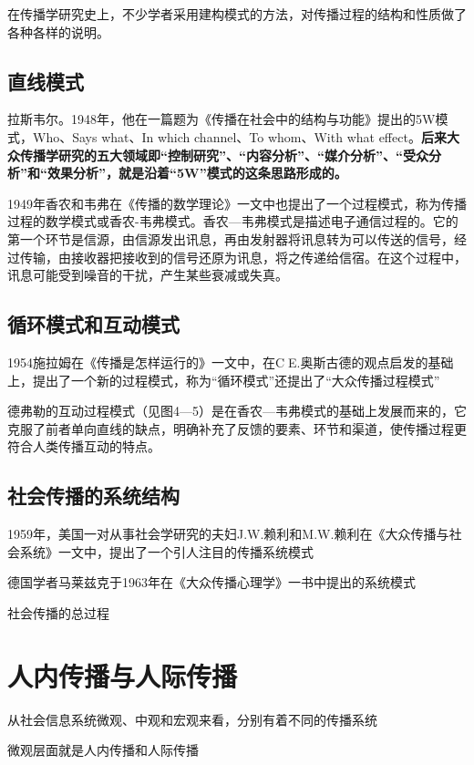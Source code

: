 \documentclass[UTF8,12pt]{ctexart}
\numberwithin{equation}{section} %
\numberwithin{figure}{section}
\numberwithin{table}{section}
\begin{document}
	在传播学研究史上，不少学者采用建构模式的方法，对传播过程的结构和性质做了各种各样的说明。
	
	\subsection{直线模式}
		
	拉斯韦尔。1948年，他在一篇题为《传播在社会中的结构与功能》提出的5W模式，Who、Says what、In which channel、To whom、With what effect。\textbf{后来大众传播学研究的五大领域即“控制研究”、“内容分析”、“媒介分析”、“受众分析”和“效果分析”，就是沿着“5W”模式的这条思路形成的。}
	
	1949年香农和韦弗在《传播的数学理论》一文中也提出了一个过程模式，称为传播过程的数学模式或香农-韦弗模式。香农—韦弗模式是描述电子通信过程的。它的第一个环节是信源，由信源发出讯息，再由发射器将讯息转为可以传送的信号，经过传输，由接收器把接收到的信号还原为讯息，将之传递给信宿。在这个过程中，讯息可能受到噪音的干扰，产生某些衰减或失真。
	
	\subsection{循环模式和互动模式}
	
	1954施拉姆在《传播是怎样运行的》一文中，在CE.奥斯古德的观点启发的基础上，提出了一个新的过程模式，称为“循环模式”还提出了“大众传播过程模式”
	
	德弗勒的互动过程模式（见图4—5）是在香农—韦弗模式的基础上发展而来的，它克服了前者单向直线的缺点，明确补充了反馈的要素、环节和渠道，使传播过程更符合人类传播互动的特点。
	
	
	\subsection{社会传播的系统结构}
	
	1959年，美国一对从事社会学研究的夫妇J.W.赖利和M.W.赖利在《大众传播与社会系统》一文中，提出了一个引人注目的传播系统模式
	
	德国学者马莱兹克于1963年在《大众传播心理学》一书中提出的系统模式
	
	社会传播的总过程
	
	\section{人内传播与人际传播}
	
	从社会信息系统微观、中观和宏观来看，分别有着不同的传播系统
	
	微观层面就是人内传播和人际传播
	
\end{document}
